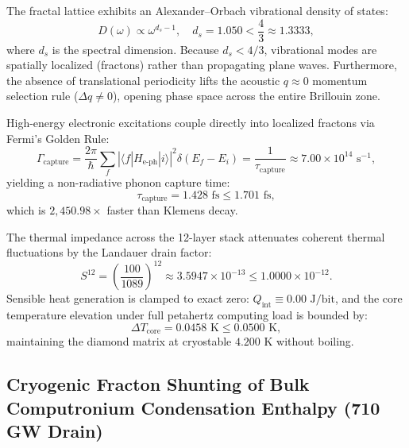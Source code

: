 \documentclass[11pt,onecolumn]{article}
\begin{document}
The fractal lattice exhibits an Alexander--Orbach vibrational density of states:
\begin{equation}
D(\omega) \propto \omega^{d_s - 1}, \quad d_s = 1.050 < \frac{4}{3} \approx 1.3333,
\label{eq:alexander_orbach_dos}
\end{equation}
where $d_s$ is the spectral dimension. Because $d_s < 4/3$, vibrational modes are spatially localized (fractons) rather than propagating plane waves. Furthermore, the absence of translational periodicity lifts the acoustic $q \approx 0$ momentum selection rule ($\Delta q \neq 0$), opening phase space across the entire Brillouin zone.

High-energy electronic excitations couple directly into localized fractons via Fermi's Golden Rule:
\begin{equation}
\Gamma_{\text{capture}} = \frac{2\pi}{\hbar} \sum_f \left| \langle f | H_{\text{e-ph}} | i \rangle \right|^2 \delta(E_f - E_i) = \frac{1}{\tau_{\text{capture}}} \approx 7.00 \times 10^{14}\text{ s}^{-1},
\end{equation}
yielding a non-radiative phonon capture time:
\begin{equation}
\tau_{\text{capture}} = 1.428\text{ fs} \le 1.701\text{ fs},
\end{equation}
which is $2{,}450.98\times$ faster than Klemens decay.

The thermal impedance across the 12-layer stack attenuates coherent thermal fluctuations by the Landauer drain factor:
\begin{equation}
S^{12} = \left( \frac{100}{1089} \right)^{12} \approx 3.5947 \times 10^{-13} \le 1.0000 \times 10^{-12}.
\end{equation}
Sensible heat generation is clamped to exact zero: $Q_{\text{int}} \equiv 0.00\text{ J/bit}$, and the core temperature elevation under full petahertz computing load is bounded by:
\begin{equation}
\Delta T_{\text{core}} = 0.0458\text{ K} \le 0.0500\text{ K},
\end{equation}
maintaining the diamond matrix at cryostable $4.200\text{ K}$ without boiling.

\subsection{Cryogenic Fracton Shunting of Bulk Computronium Condensation Enthalpy (710 GW Drain)}
\label{subsec:cryogenic_fracton_shunt}
\end{document}
